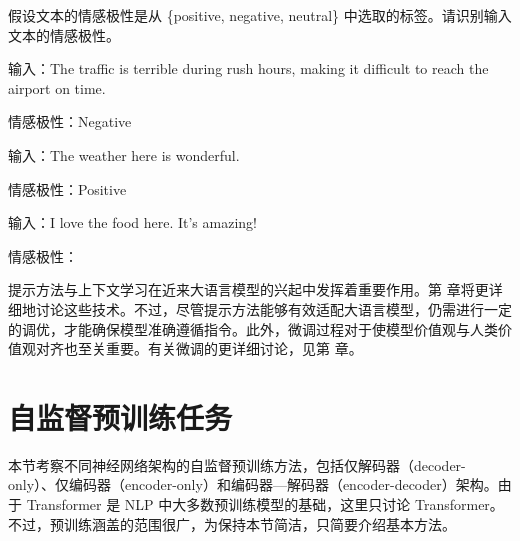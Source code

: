 \vspace{0.5em}
\begin{tcolorbox}

\begingroup
\setlength{\leftskip}{2em}
\setlength{\rightskip}{2em}

假设文本的情感极性是从 \{positive, negative, neutral\} 中选取的标签。请识别输入文本的情感极性。

\vspace{0.2cm}

{\color{blue} 输入}：The traffic is terrible during rush hours, making it difficult to reach the airport on time.

\vspace{0.2cm}

{\color{red} 情感极性}：Negative

\vspace{0.2cm}

{\color{blue} 输入}：The weather here is wonderful.

\vspace{0.2cm}

{\color{red} 情感极性}：Positive

\vspace{0.2cm}

{\color{blue} 输入}：I love the food here. It's amazing!

\vspace{0.2cm}

{\color{red} 情感极性}：\underline{\hspace{3em}}

\endgroup

\end{tcolorbox}
\vspace{0.5em}

提示方法与上下文学习在近来大语言模型的兴起中发挥着重要作用。第 \ChapterLLMPrompting 章将更详细地讨论这些技术。不过，尽管提示方法能够有效适配大语言模型，仍需进行一定的调优，才能确保模型准确遵循指令。此外，微调过程对于使模型价值观与人类价值观对齐也至关重要。有关微调的更详细讨论，见第 \ChapterLLMTuning 章。

\section{自监督预训练任务}

\noindent 本节考察不同神经网络架构的自监督预训练方法，包括仅解码器（decoder-only）、仅编码器（encoder-only）和编码器—解码器（encoder-decoder）架构。由于 Transformer 是 NLP 中大多数预训练模型的基础，这里只讨论 Transformer。不过，预训练涵盖的范围很广，为保持本节简洁，只简要介绍基本方法。

